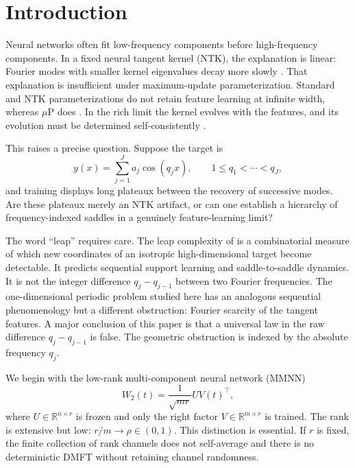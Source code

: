 \documentclass[11pt]{article}
\newcommand{\R}{\mathbb R}
\newcommand{\1}{\mathbf 1}
\theoremstyle{plain}
\theoremstyle{definition}
\begin{document}
\section{Introduction}

Neural networks often fit low-frequency components before high-frequency
components.  In a fixed neural tangent kernel (NTK), the explanation is
linear: Fourier modes with smaller kernel eigenvalues decay more slowly
\citep{basri2020frequency,rahaman2019spectral}.  That explanation is
insufficient under maximum-update parameterization.  Standard and NTK
parameterizations do not retain feature learning at infinite width, whereas
\(\mu\)P does \citep{yang2021feature}.  In the rich limit the kernel evolves
with the features, and its evolution must be determined self-consistently
\citep{bordelon2022dmft}.

This raises a precise question.  Suppose the target is
\begin{equation}
 y(x)=\sum_{j=1}^J a_j\cos(q_jx),\qquad
 1\leq q_1<\cdots<q_J,
 \label{eq:target}
\end{equation}
and training displays long plateaux between the recovery of successive
modes.  Are these plateaux merely an NTK artifact, or can one establish a
hierarchy of frequency-indexed saddles in a genuinely feature-learning
limit?

The word ``leap'' requires care.  The leap complexity of
\citet{abbe2023leap} is a combinatorial measure of which new coordinates of
an isotropic high-dimensional target become detectable.  It predicts
sequential support learning and saddle-to-saddle dynamics.  It is not the
integer difference \(q_j-q_{j-1}\) between two Fourier frequencies.  The
one-dimensional periodic problem studied here has an analogous sequential
phenomenology but a different obstruction: Fourier scarcity of the tangent
features.  A major conclusion of this paper is that a universal law in the
raw difference \(q_j-q_{j-1}\) is false.  The geometric obstruction is
indexed by the absolute frequency \(q_j\).

We begin with the low-rank multi-component neural network (MMNN)
\begin{equation}
 W_2(t)=\frac{1}{\sqrt{mr}}U V(t)^\top,
 \label{eq:factorization}
\end{equation}
where \(U\in\R^{n\times r}\) is frozen and only the right factor
\(V\in\R^{m\times r}\) is trained.  The rank is extensive but low:
\(r/m\to\rho\in(0,1)\).  This distinction is essential.  If \(r\) is fixed,
the finite collection of rank channels does not self-average and there is no
deterministic DMFT without retaining channel randomness.
\end{document}
